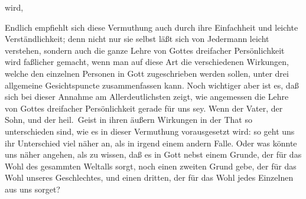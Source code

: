 \begin{aufza}
\begin{aufzb}
wird, \usw\
\item Endlich empfiehlt sich diese Vermuthung auch durch ihre Einfachheit und leichte Verständlichkeit; denn nicht nur sie selbst läßt sich von Jedermann leicht verstehen, sondern auch die ganze Lehre von Gottes dreifacher Persönlichkeit wird faßlicher gemacht, wenn man auf diese Art die verschiedenen Wirkungen, welche den einzelnen Personen in Gott zugeschrieben werden sollen, unter drei allgemeine Gesichtspuncte zusammenfassen kann. Noch wichtiger aber ist es, daß sich bei dieser Annahme am Allerdeutlichsten zeigt, wie angemessen die Lehre von Gottes dreifacher Persönlichkeit gerade für uns sey. Wenn der Vater, der Sohn, und der heil.\ Geist in ihren äußern Wirkungen in der That so unterschieden sind, wie es in dieser Vermuthung vorausgesetzt wird: so geht uns ihr Unterschied viel näher an, als in irgend einem andern Falle. Oder was könnte uns näher angehen, als zu wissen, daß es in Gott nebst einem Grunde, der für das Wohl des gesammten Weltalls sorgt, noch einen zweiten Grund gebe, der für das Wohl unseres Geschlechtes, und einen dritten, der für das Wohl jedes Einzelnen aus uns sorget?
\end{aufzb}
\end{aufza}

